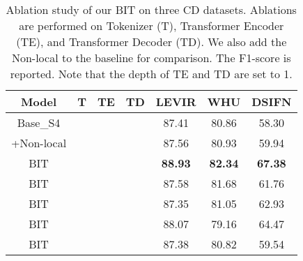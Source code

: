 \documentclass[journal]{IEEEtran}
\begin{document}
\begin{table}
    \centering
    \caption{Ablation study of our BIT on three CD datasets. Ablations are performed on Tokenizer (T), Transformer Encoder (TE), and Transformer Decoder (TD). We also add the Non-local to the baseline for comparison. The F1-score is reported. Note that the depth of TE and TD are set to 1.}
\begin{tabular}{ccccccc}
    \toprule
    Model & T & TE & TD & LEVIR & WHU & DSIFN \\
    \midrule
    Base\_S4 &  &  &   & 87.41 & 80.86 & 58.30  \\ 
    +Non-local &  &  &  & 87.56 & 80.93 & 59.94 \\
    \midrule 
    BIT &  &  &  & \textbf{88.93} & \textbf{82.34} & \textbf{67.38} \\
    BIT &  &  &  & 87.58 & 81.68 & 61.76 \\
    BIT &  &  &   & 87.35 & 81.05 & 62.93 \\
    BIT &  &   &  & 88.07 & 79.16 & 64.47 \\
    BIT &  &   &  & 87.38 & 80.82 & 59.54 \\
    \bottomrule
    \end{tabular}
\label{tab:abalation_bit}
\end{table}
\end{document}
